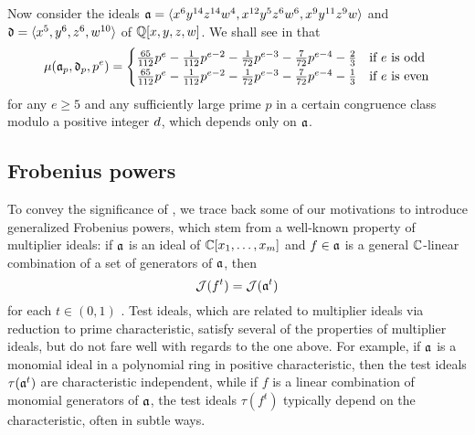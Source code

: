 \documentclass{amsart}
\begin{document}
\begin{example}
   Now consider the ideals $\mathfrak{a} = \langle x^6 y^{14} z^{14} w^4, x^{12} y^5 z^6 w^6, x^9 y^{11} z^9 w \rangle$ and $\mathfrak{d} = \langle x^5,y^6,z^6,w^{10} \rangle$ of $\mathbb{Q}[x,y,z,w]$.
   We shall see in  that
     \[
      \mu(\mathfrak{a}_p,\mathfrak{d}_p,p^e) =
      \begin{cases}
         \frac{65}{112}p^e - \frac{1}{112}p^{e-2} - \frac{1}{72}p^{e-3} - \frac{7}{72}p^{e-4} - \frac23 & \text{if $e$ is odd}\\
         \frac{65}{112}p^e - \frac{1}{112}p^{e-2} - \frac{1}{72}p^{e-3} - \frac{7}{72}p^{e-4} - \frac13 & \text{if $e$ is even}
      \end{cases}
   \]
   for any $e \ge 5$ and any sufficiently large prime $p$ in a certain congruence class modulo a positive integer $d$, which depends only on $\mathfrak{a}$.
\end{example}

\subsection{Frobenius powers}
To convey the significance of , we trace back some of our motivations to introduce generalized Frobenius powers, which stem from a well-known property of multiplier ideals:
if $\mathfrak{a}$ is an ideal of $\mathbb{C}[x_1,\ldots,x_m]$ and $f \in \mathfrak{a}$ is a general $\mathbb{C}$-linear combination of a set of generators of $\mathfrak{a}$, then
\[ \mathcal{J}(f^t) = \mathcal{J}(\mathfrak{a}^t)\]
for each $t \in (0,1)$ \cite[Proposition~9.2.28]{lazarsfeld.positivity-II}.
Test ideals, which are related to multiplier ideals via reduction to prime characteristic, satisfy several of the properties of multiplier ideals, but do not fare well with regards to the one above. 
For example, if $\mathfrak{a}$ is a monomial ideal in a polynomial ring in positive characteristic, then the test ideals $\tau(\mathfrak{a}^t)$ are characteristic independent, while if $f$ is a linear combination of monomial generators of $\mathfrak{a}$, the test ideals $\tau(f^t)$ typically depend on the characteristic, often in subtle ways.

\end{document}

